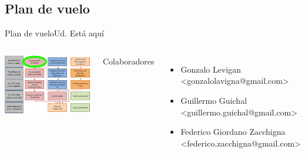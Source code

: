  \subsection{Plan de vuelo}
 \begin{frame}{Plan de vuelo}{Ud. Está aquí}
    \begin{columns}[onlytextwidth]
       \center\includegraphics[width=1.0\textwidth]{1_clase/Esquema_MSE}
       \tiny{
          Colaboradores
          \begin{itemize}
             \item{Gonzalo Levigan             \\ <gonzalolavigna@gmail.com>}
             \item{Guillermo Guichal           \\ <guillermo.guichal@gmail.com>}
             \item{Federico Giordano Zacchigna \\ <federico.zacchigna@gmail.com>}
          \end{itemize}
        }
    \end{columns}
    \vfill
 \end{frame}
